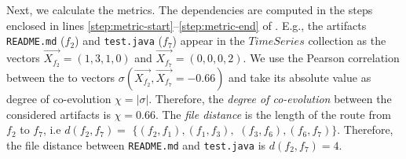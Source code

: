 Next, we calculate the metrics. The dependencies are computed in the steps enclosed in lines \ref{step:metric-start}--\ref{step:metric-end} of . E.g., the artifacts \texttt{README.md} ($f_2$) and \texttt{test.java} ($f_7$) appear in the $TimeSeries$ collection as the vectors $\vec{X_{f_2}} = (1, 3, 1, 0)$ and $\vec{X_{f_7}} = (0, 0, 0, 2)$. We use the Pearson correlation between the to vectors $\sigma(\vec{X_{f_2}},\vec{X_{f_7}}=-0.66)$ and take its absolute value as degree of co-evolution $\chi = |\sigma|$. Therefore, the \emph{degree of co-evolution} between the considered artifacts is $\chi = 0.66$. The \emph{file distance} is the length of the route from $f_2$ to $f_7$, i.e $d({f_2,f_7}) = $ $\{(f_2,f_1), (f_1,f_3),$ $(f_3,f_6), (f_6,f_7)\}$. Therefore, the file distance between \texttt{README.md} and \texttt{test.java} is $d({f_2,f_7}) = 4$.


%
%




%

